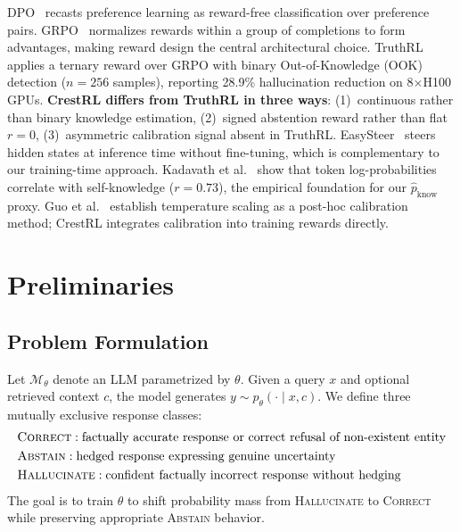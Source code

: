 \documentclass[11pt]{article}
\begin{document}
DPO~\cite{rafailov2023dpo} recasts preference learning as reward-free classification over preference pairs. GRPO~\cite{deepseek2024grpo} normalizes rewards within a group of completions to form advantages, making reward design the central architectural choice. TruthRL~\cite{truthrl2025} applies a ternary reward over GRPO with binary Out-of-Knowledge (OOK) detection ($n=256$ samples), reporting 28.9\% hallucination reduction on 8$\times$H100 GPUs. \textbf{CrestRL differs from TruthRL in three ways}: (1)~continuous rather than binary knowledge estimation, (2)~signed abstention reward rather than flat $r=0$, (3)~asymmetric calibration signal absent in TruthRL. EasySteer~\cite{easysteer2025} steers hidden states at inference time without fine-tuning, which is complementary to our training-time approach. Kadavath et al.~\cite{kadavath2022language} show that token log-probabilities correlate with self-knowledge ($r=0.73$), the empirical foundation for our $\hat{p}_{\text{know}}$ proxy. Guo et al.~\cite{guo2017calibration} establish temperature scaling as a post-hoc calibration method; CrestRL integrates calibration into training rewards directly.

\section{Preliminaries}
\label{sec:prelim}

\subsection{Problem Formulation}

Let $\mathcal{M}_\theta$ denote an LLM parametrized by $\theta$. Given a query $x$ and optional retrieved context $c$, the model generates $y \sim p_\theta(\cdot \mid x, c)$. We define three mutually exclusive response classes:
\begin{align*}
&\textsc{Correct}: \text{factually accurate response or correct refusal of non-existent entity}\\
&\textsc{Abstain}: \text{hedged response expressing genuine uncertainty}\\
&\textsc{Hallucinate}: \text{confident factually incorrect response without hedging}
\end{align*}
The goal is to train $\theta$ to shift probability mass from \textsc{Hallucinate} to \textsc{Correct} while preserving appropriate \textsc{Abstain} behavior.
\end{document}
